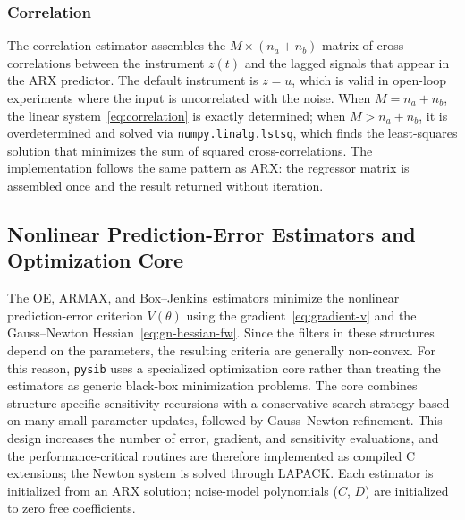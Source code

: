 \documentclass{ifacconf}
\begin{document}
\subsubsection{Correlation}
\label{subsubsec:correlation}

The correlation estimator assembles the $M \times (n_a+n_b)$ matrix
of cross-correlations between the instrument $z(t)$ and the lagged
signals that appear in the ARX predictor.
The default instrument is $z = u$, which is valid in open-loop
experiments where the input is uncorrelated with the noise.
When $M = n_a + n_b$, the linear system~\eqref{eq:correlation}
is exactly determined; when $M > n_a + n_b$, it is overdetermined
and solved via \texttt{numpy.linalg.lstsq}, which finds the
least-squares solution that minimizes the sum of squared
cross-correlations.
The implementation follows the same pattern as ARX: the regressor
matrix is assembled once and the result returned without iteration.

\subsection{Nonlinear Prediction-Error Estimators and Optimization Core}
\label{subsec:nonlinear-optimization-core}

The OE, ARMAX, and Box--Jenkins estimators minimize the nonlinear
prediction-error criterion $V(\theta)$ using the
gradient~\eqref{eq:gradient-v} and the Gauss--Newton
Hessian~\eqref{eq:gn-hessian-fw}.  Since the filters in these structures
depend on the parameters, the resulting criteria are generally non-convex.
For this reason, \texttt{pysib} uses a specialized optimization core rather
than treating the estimators as generic black-box minimization problems.
The core combines structure-specific sensitivity recursions with a
conservative search strategy based on many small parameter updates, followed
by Gauss--Newton refinement.  This design increases the number of error,
gradient, and sensitivity evaluations, and the performance-critical routines
are therefore implemented as compiled C extensions; the Newton system is
solved through LAPACK.  Each estimator is initialized from an ARX solution;
noise-model polynomials ($C$, $D$) are initialized to zero free coefficients.
\end{document}
